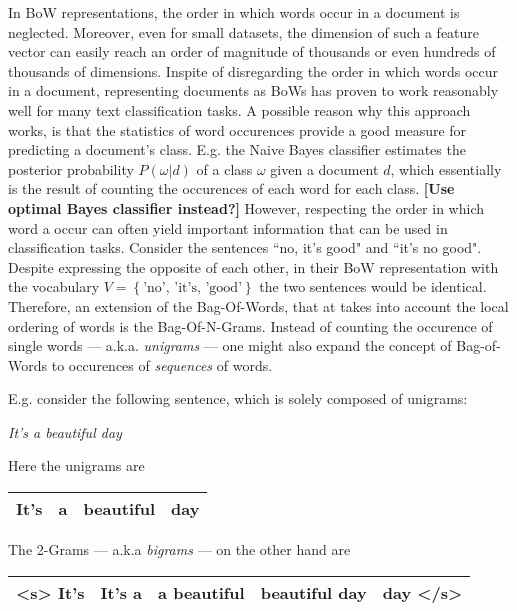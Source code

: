 In BoW representations, the order in which words occur in a document is
neglected.
Moreover, even for small datasets, the dimension of such a feature vector 
can easily reach an order of magnitude of thousands or even hundreds of thousands of dimensions.
Inspite of disregarding the order in which words occur in a
document, representing documents as BoWs has proven to work reasonably well for
many text classification tasks. A possible reason why this approach works, is
that the statistics of word occurences provide a good measure for predicting a
document's class. E.g. the Naive Bayes classifier estimates the posterior
probability $P(\omega|d)$ of a class $\omega$ given a document $d$,
which essentially is the result of counting the occurences of each word for each
class. \textbf{[Use optimal Bayes classifier instead?]
}
However, respecting the order in which word a occur can often yield important
information that can be used in classification tasks. Consider the sentences
``no, it's good" and ``it's no good". Despite expressing the opposite of each
other, in their BoW representation with the vocabulary $V= \left\{\text{'no',
'it's, 'good'} \right\}$ the two sentences would be identical. Therefore, an
extension of the Bag-Of-Words, that at takes into account the local ordering
of words is the Bag-Of-N-Grams.
Instead of counting the occurence of single words --- a.k.a. \emph{unigrams} --- one might
also expand the concept of Bag-of-Words to occurences of \textit{sequences} of
words.

E.g. consider the following sentence, which is solely composed of unigrams:

\begin{center} 
\textit{It's a beautiful day}
\end{center} 

Here the unigrams are

\begin{center}


\begin{tabular}{|c|c|c|c|}
\hline 
It's & a & beautiful & day \\
\hline
\end{tabular}

\end{center}
 

The 2-Grams --- a.k.a \emph{bigrams} --- on the other hand  are 

\begin{center}
\begin{tabular}{|c|c|c|c|c|}
\hline 
<s> It's & It's a & a beautiful & beautiful day & day </s> \\
\hline
\end{tabular}
\end{center}

